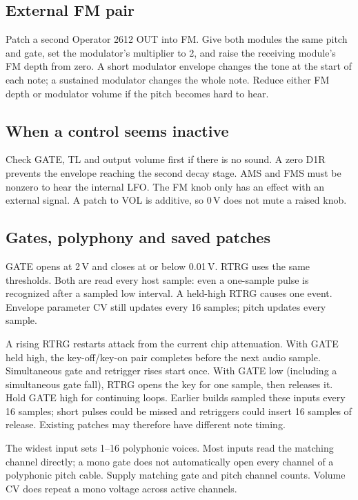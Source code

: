 \subsection{External FM pair}
Patch a second Operator 2612 OUT into FM. Give both modules the same pitch and
gate, set the modulator's multiplier to 2, and raise the receiving module's
FM depth from zero. A short modulator envelope changes the tone at the start
of each note; a sustained modulator changes the whole note. Reduce either
FM depth or modulator volume if the pitch becomes hard to hear.

\subsection{When a control seems inactive}
Check GATE, TL and output volume first if there is no sound. A zero D1R
prevents the envelope reaching the second decay stage. AMS and FMS must be
nonzero to hear the internal LFO. The FM knob only has an effect with an
external signal. A patch to VOL is additive, so 0\,V does not mute a raised knob.

\subsection{Gates, polyphony and saved patches}
GATE opens at 2\,V and closes at or below 0.01\,V. RTRG uses the same
thresholds. Both are read every host sample: even a one-sample pulse is
recognized after a sampled low interval. A held-high RTRG causes one event.
Envelope parameter CV still updates every 16 samples; pitch updates every sample.

A rising RTRG restarts attack from the current chip attenuation. With GATE
held high, the key-off/key-on pair completes before the next audio sample.
Simultaneous gate and retrigger rises start once. With GATE low (including a
simultaneous gate fall), RTRG opens the key for one sample, then releases it.
Hold GATE high for continuing loops. Earlier builds sampled these inputs
every 16 samples; short pulses could be missed and retriggers could insert
16 samples of release. Existing patches may therefore have different note timing.

The widest input sets 1--16 polyphonic voices. Most inputs read the matching
channel directly; a mono gate does not automatically open every channel of
a polyphonic pitch cable. Supply matching gate and pitch channel counts.
Volume CV does repeat a mono voltage across active channels.

